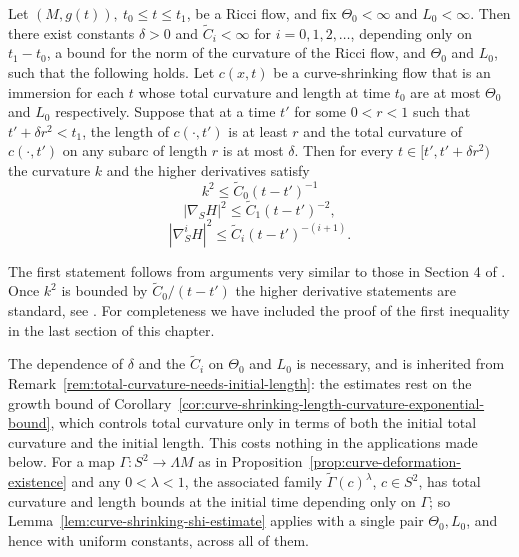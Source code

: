 \begin{lemma}
\label{lem:curve-shrinking-shi-estimate}
\label{CSSHI}
Let $(M,g(t)),\ t_0\le t\le t_1$, be a Ricci flow, and fix $\Theta_0<\infty$ and
$L_0<\infty$. Then there exist
constants $\delta>0$ and $\widetilde C_i<\infty$ for
$i=0,1,2,\ldots$, depending only on $t_1-t_0$, a bound for the
norm of the curvature of the Ricci flow, and $\Theta_0$ and $L_0$, such that the
following
holds. Let $c(x,t)$ be a curve-shrinking flow that is an immersion
for each $t$ whose total curvature and length at time $t_0$ are at most
$\Theta_0$ and $L_0$ respectively. Suppose that at a time $t'$ for some $0<r<1$ such that
$t'+\delta r^2<t_1$, the length of $c(\cdot,t')$ is at least $r$ and
the total curvature of $c(\cdot,t')$ on any subarc of length $r$ is
at most $\delta$. Then for every $t\in [t',t'+\delta r^2)$ the
curvature $k$ and the higher derivatives satisfy
$$k^2\le\widetilde C_0(t-t')^{-1}$$
$$|\nabla_SH|^2\le \widetilde C_1(t-t')^{-2},$$
$$|\nabla_S^iH|^2\le \widetilde C_i(t-t')^{-(i+1)}.$$
\end{lemma}

The first statement follows from arguments very similar to those in
Section 4 of \cite{AG}. Once $k^2$ is bounded by $\widetilde
C_0/(t-t')$ the higher derivative statements are standard, see
\cite{Altschuler}. For completeness we have included the proof of
the first inequality in the last section of this chapter.

\begin{remark}
\label{rem:shi-constants-depend-on-initial-data}
The dependence of $\delta$ and the $\widetilde C_i$ on $\Theta_0$ and $L_0$ is
necessary, and is inherited from
Remark~\ref{rem:total-curvature-needs-initial-length}: the estimates rest on the
growth bound of
Corollary~\ref{cor:curve-shrinking-length-curvature-exponential-bound}, which
controls total curvature only in terms of both the initial total curvature and
the initial length. This costs nothing in the applications made below. For a map
$\Gamma\colon S^2\to\Lambda M$ as in
Proposition~\ref{prop:curve-deformation-existence} and any $0<\lambda<1$, the
associated family $\widetilde\Gamma(c)^\lambda$, $c\in S^2$, has total curvature
and length bounds at the initial time depending only on $\Gamma$; so
Lemma~\ref{lem:curve-shrinking-shi-estimate} applies with a single pair
$\Theta_0,L_0$, and hence with uniform constants, across all of them.
\end{remark}




